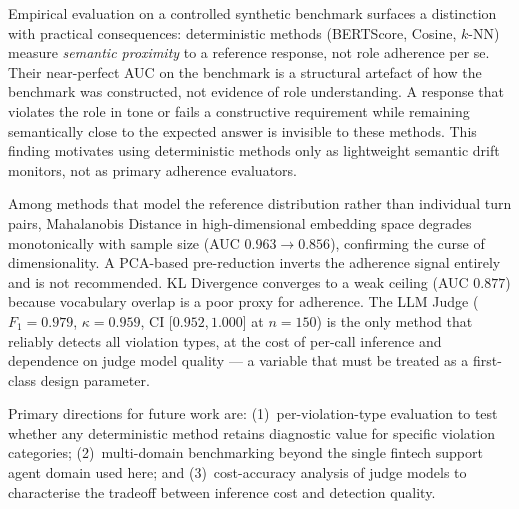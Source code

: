 \documentclass[11pt,a4paper]{article}
\begin{document}
Empirical evaluation on a controlled synthetic benchmark surfaces a distinction
with practical consequences: deterministic methods (BERTScore, Cosine, $k$-NN)
measure \emph{semantic proximity} to a reference response, not role adherence
per se. Their near-perfect AUC on the benchmark is a structural artefact of
how the benchmark was constructed, not evidence of role understanding. A
response that violates the role in tone or fails a constructive requirement
while remaining semantically close to the expected answer is invisible to
these methods. This finding motivates using deterministic methods only as
lightweight semantic drift monitors, not as primary adherence evaluators.

Among methods that model the reference distribution rather than individual
turn pairs, Mahalanobis Distance in high-dimensional embedding space degrades
monotonically with sample size (AUC $0.963 \to 0.856$), confirming the
curse of dimensionality. A PCA-based pre-reduction inverts the adherence signal
entirely and is not recommended. KL Divergence converges to a weak ceiling
(AUC $0.877$) because vocabulary overlap is a poor proxy for adherence.
The LLM Judge ($F_1 = 0.979$, $\kappa = 0.959$, CI [$0.952$,\,$1.000$]
at $n = 150$) is the only method that reliably detects all violation types,
at the cost of per-call inference and dependence on judge model quality ---
a variable that must be treated as a first-class design parameter.

Primary directions for future work are: (1)~per-violation-type evaluation to
test whether any deterministic method retains diagnostic value for specific
violation categories; (2)~multi-domain benchmarking beyond the single fintech
support agent domain used here; and (3)~cost-accuracy analysis of judge models
to characterise the tradeoff between inference cost and detection quality.



\end{document}
